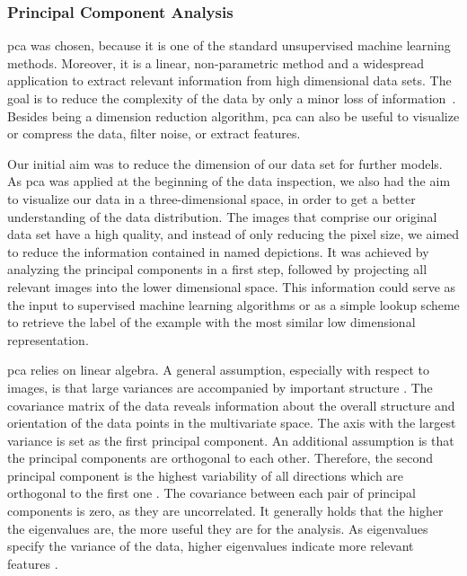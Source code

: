\subsubsection{Principal Component Analysis}
\label{subsec:PCA}

\acrlong{pca} was chosen, because it is one of the standard unsupervised machine learning methods. Moreover, it is a linear, non-parametric method and a widespread application to extract relevant information from high dimensional data sets. The goal is to reduce the complexity of the data by only a minor loss of information~\citep{shlens2014}. Besides being a dimension reduction algorithm, \acrshort{pca} can also be useful to visualize or compress the data, filter noise, or extract features.

\bigskip
Our initial aim was to reduce the dimension of our data set for further models. As \acrshort{pca} was applied at the beginning of the data inspection, we also had the aim to visualize our data in a three-dimensional space, in order to get a better understanding of the data distribution. The images that comprise our original data set have a high quality, and instead of only reducing the pixel size, we aimed to reduce the information contained in named depictions. It was achieved by analyzing the principal components in a first step, followed by projecting all relevant images into the lower dimensional space. This information could serve as the input to supervised machine learning algorithms or as a simple lookup scheme to retrieve the label of the example with the most similar low dimensional representation.

\bigskip
\acrshort{pca} relies on linear algebra. A general assumption, especially with respect to images, is that large variances are accompanied by important structure \citep{shlens2014}. The covariance matrix of the data reveals information about the overall structure and orientation of the data points in the multivariate space. The axis with the largest variance is set as the first principal component. An additional assumption is that the principal components are orthogonal to each other. Therefore, the second principal component is the highest variability of all directions which are orthogonal to the first one \citep{bohling2006}. The covariance between each pair of principal components is zero, as they are uncorrelated. It generally holds that the higher the eigenvalues are, the more useful they are for the analysis. As eigenvalues specify the variance of the data, higher eigenvalues indicate more relevant features \citep{shlens2014}.

